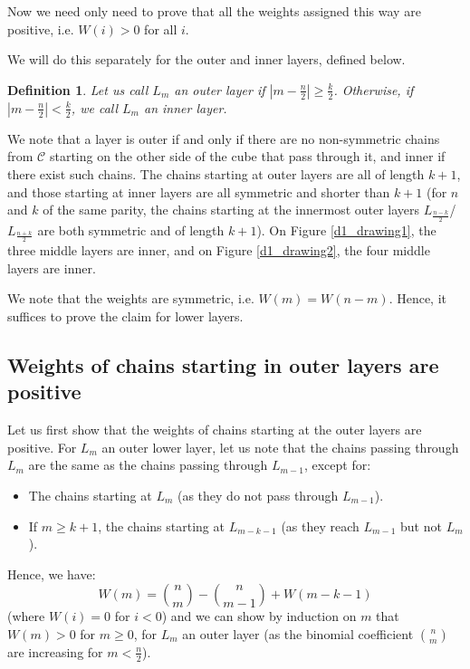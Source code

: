 \documentclass[11pt, reqno]{amsart}
\newtheorem{definition}[theorem]{Definition}
\numberwithin{equation}{section}
\begin{document}
Now we need only need to prove that all the weights assigned this way are positive, i.e. $W(i) > 0$ for all $i$.

We will do this separately for the outer and inner layers, defined below.

\begin{definition}
    Let us call $L_m$ an \emph{outer layer} if $|m-\frac{n}{2}| \geqslant \frac{k}{2}$. Otherwise, if $|m-\frac{n}{2}| < \frac{k}{2}$, we call $L_m$ an \emph{inner layer}.
\end{definition}

We note that a layer is outer if and only if there are no non-symmetric chains from $\mathcal{C}$ starting on the other side of the cube that pass through it, and inner if there exist such chains. The chains starting at outer layers are all of length $k+1$, and those starting at inner layers are all symmetric and shorter than $k+1$ (for $n$ and $k$ of the same parity, the chains starting at the innermost outer layers $L_{\frac{n-k}{2}}$/$L_{\frac{n+k}{2}}$ are both symmetric and of length $k+1$). On Figure \ref{d1_drawing1}, the three middle layers are inner, and on Figure \ref{d1_drawing2}, the four middle layers are inner.

We note that the weights are symmetric, i.e. $W(m)=W(n-m)$. Hence, it suffices to prove the claim for lower layers.

\subsection{Weights of chains starting in outer layers are positive}

Let us first show that the weights of chains starting at the outer layers are positive. For $L_m$ an outer lower layer, let us note that the chains passing through $L_{m}$ are the same as the chains passing through $L_{m-1}$, except for:
\begin{itemize}
    \item The chains starting at $L_m$ (as they do not pass through $L_{m-1}$).
    \item If $m \geqslant k+1$, the chains starting at $L_{m-k-1}$ (as they reach $L_{m-1}$ but not $L_m$).
\end{itemize}
Hence, we have:
\begin{equation}
    W(m)=\binom{n}{m} - \binom{n}{m-1} + W(m-k-1)
\end{equation}
(where $W(i)=0$ for $i<0$) and we can show by induction on $m$ that $W(m) > 0$ for $m \geqslant 0$, for $L_m$ an outer layer (as the binomial coefficient $\binom{n}{m}$ are increasing for $m < \frac{n}{2}$).
\end{document}
